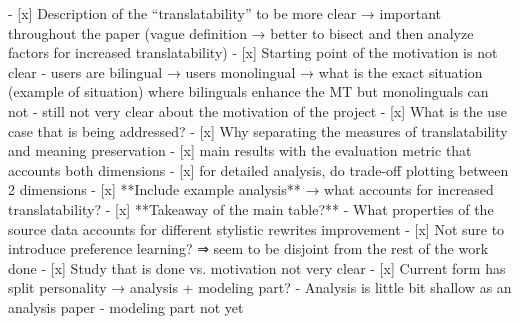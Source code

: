 - [x]  Description of the “translatability” to be more clear → important throughout the paper (vague definition → better to bisect and then analyze factors for increased translatability)
- [x]  Starting point of the motivation is not clear
    - users are bilingual → users monolingual → what is the exact situation (example of situation) where bilinguals enhance the MT but monolinguals can not
    - still not very clear about the motivation of the project
- [x]  What is the use case that is being addressed?
- [x]  Why separating the measures of translatability and meaning preservation
    - [x]  main results with the evaluation metric that accounts both dimensions
    - [x]  for detailed analysis, do trade-off plotting between 2 dimensions
- [x]  **Include example analysis** → what accounts for increased translatability?
- [x]  **Takeaway of the main table?**
    - What properties of the source data accounts for different stylistic rewrites improvement
- [x]  Not sure to introduce preference learning? ⇒ seem to be disjoint from the rest of the work done
- [x]  Study that is done vs. motivation not very clear
- [x]  Current form has split personality → analysis + modeling part?
    - Analysis is little bit shallow as an analysis paper
    - modeling part not yet